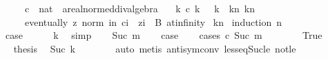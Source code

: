 \begin{isabellebody}
\ \ \ \ \ c\ {\isacharcolon}{\kern0pt}{\isacharcolon}{\kern0pt}\ {\isachardoublequoteopen}nat\ {\isasymRightarrow}\ {\isacharprime}{\kern0pt}a{\isacharcolon}{\kern0pt}{\isacharcolon}{\kern0pt}real{\isacharunderscore}{\kern0pt}normed{\isacharunderscore}{\kern0pt}div{\isacharunderscore}{\kern0pt}algebra{\isachardoublequoteclose}\isanewline
\ \ \ k{\isacharcolon}{\kern0pt}\ {\isachardoublequoteopen}c\ k\ {\isasymnoteq}\ {}{\isachardoublequoteclose}\ {\isachardoublequoteopen}{}{\isasymle}k{\isachardoublequoteclose}\ \ kn{\isacharcolon}{\kern0pt}\ {\isachardoublequoteopen}k{\isasymle}n{\isachardoublequoteclose}\isanewline
\ \ \ \ \ {\isachardoublequoteopen}eventually\ {\isacharparenleft}{\kern0pt}{\isasymlambda}z{\isachardot}{\kern0pt}\ norm\ {\isacharparenleft}{\kern0pt}{\isasymSum}i{\isasymle}n{\isachardot}{\kern0pt}\ c{\isacharparenleft}{\kern0pt}i{\isacharparenright}{\kern0pt}\ {\isacharasterisk}{\kern0pt}\ z{\isacharcircum}{\kern0pt}i{\isacharparenright}{\kern0pt}\ {\isasymge}\ B{\isacharparenright}{\kern0pt}\ at{\isacharunderscore}{\kern0pt}infinity{\isachardoublequoteclose}\isanewline
%
\isadelimproof
%
\endisadelimproof
%
\isatagproof
{}\isamarkupfalse%
\ kn\isanewline
{}\isamarkupfalse%
\ {\isacharparenleft}{\kern0pt}induction\ n{\isacharparenright}{\kern0pt}\isanewline
\ \ \isamarkupfalse%
\ {}\isanewline
\ \ \isamarkupfalse%
\ \isamarkupfalse%
\ {\isacharquery}{\kern0pt}case\isanewline
\ \ \ \ \isamarkupfalse%
\ k\ \isamarkupfalse%
\ simp\isanewline
{}\isamarkupfalse%
\isanewline
\ \ \isamarkupfalse%
\ {\isacharparenleft}{\kern0pt}Suc\ m{\isacharparenright}{\kern0pt}\isanewline
\ \ \isamarkupfalse%
\ {\isacharquery}{\kern0pt}case\isanewline
\ \ \isamarkupfalse%
\ {\isacharparenleft}{\kern0pt}cases\ {\isachardoublequoteopen}c\ {\isacharparenleft}{\kern0pt}Suc\ m{\isacharparenright}{\kern0pt}\ {\isacharequal}{\kern0pt}\ {}{\isachardoublequoteclose}{\isacharparenright}{\kern0pt}\isanewline
\ \ \ \ \isamarkupfalse%
\ True\isanewline
\ \ \ \ \isamarkupfalse%
\ \isamarkupfalse%
\ {\isacharquery}{\kern0pt}thesis\ \isamarkupfalse%
\ Suc\ k\isanewline
\ \ \ \ \ \ \isamarkupfalse%
\ auto\ {\isacharparenleft}{\kern0pt}metis\ antisym{\isacharunderscore}{\kern0pt}conv\ less{\isacharunderscore}{\kern0pt}eq{\isacharunderscore}{\kern0pt}Suc{\isacharunderscore}{\kern0pt}le\ not{\isacharunderscore}{\kern0pt}le{\isacharparenright}{\kern0pt}\isanewline

\end{isabellebody}
